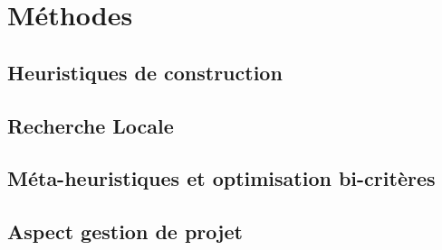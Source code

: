 \chapter{Méthodes}
    \section{Heuristiques de construction}
    \section{Recherche Locale}
    \section{Méta-heuristiques et optimisation bi-critères}
    \section{Aspect gestion de projet}